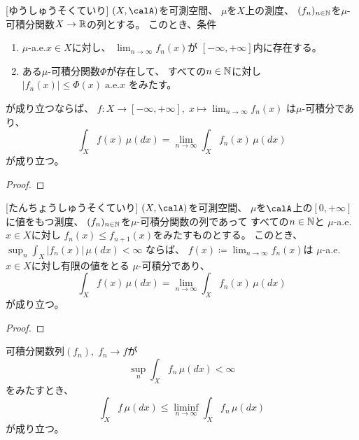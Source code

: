 \documentclass[report]{jlreq}
\begin{document}
\begin{theorem}
    [ゆうしゅうそくていり]
    $(X, \calA)$を可測空間、
    $\mu$を$X$上の測度、
    $(f_n)_{n \in \mathbb{N}}$を$\mu$-可積分関数$X \to \mathbb{R}$の列とする。
    このとき、条件
    \begin{enumerate}
        \item $\mu$-a.e.$x \in X$に対し、
            $\lim_{n \to \infty} f_n(x)$が
            $[-\infty, +\infty]$内に存在する。
        \item ある$\mu$-可積分関数$\Phi$が存在して、
            すべての$n \in \mathbb{N}$に対し
            $|f_n(x)| \le \Phi(x) \; \text{a.e.$x$}$
            をみたす。
    \end{enumerate}
    が成り立つならば、
    $f \colon X \to [-\infty, +\infty], \;
        x \mapsto \lim_{n \to \infty} f_n(x)$
    は$\mu$-可積分であり、
    \begin{equation}
        \int_X f(x) \, \mu(dx)
            = \lim_{n \to \infty} \int_X f_n(x) \, \mu(dx)
    \end{equation}
    が成り立つ。
\end{theorem}

\begin{proof}
    \TODO{}
\end{proof}

\begin{theorem}
    [たんちょうしゅうそくていり]
    $(X, \calA)$を可測空間、
    $\mu$を$\calA$上の$[0, +\infty]$に値をもつ測度、
    $(f_n)_{n \in \mathbb{N}}$を$\mu$-可積分関数の列であって
    すべての$n \in \mathbb{N}$と
    $\mu$-a.e. $x \in X$に対し
    $f_n(x) \le f_{n + 1}(x)$をみたすものとする。
    このとき、
    $\sup_n \int_X |f_n(x)| \, \mu(dx) < \infty$
    ならば、
    $f(x) \coloneqq \lim_{n \to \infty} f_n(x)$は
    $\mu$-a.e. $x \in X$に対し有限の値をとる
    $\mu$-可積分であり、
    \begin{equation}
        \int_X f(x) \, \mu(dx)
            = \lim_{n \to \infty} \int_X f_n(x) \, \mu(dx)
    \end{equation}
    が成り立つ。
\end{theorem}

\begin{proof}
    \TODO{}
\end{proof}

\begin{theorem}
    可積分関数列$(f_n), \; f_n \to f$が
    \begin{equation}
        \sup_n \int_X f_n \, \mu(dx) < \infty
    \end{equation}
    をみたすとき、
    \begin{equation}
        \int_X f \, \mu(dx)
            \le
                \liminf_{n \to \infty} \int_X f_n \, \mu(dx)
    \end{equation}
    が成り立つ。
\end{theorem}
\end{document}
